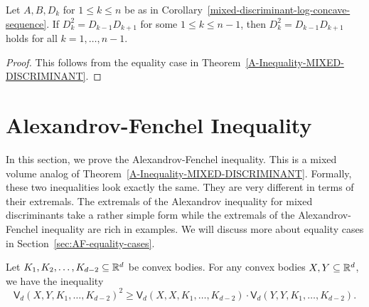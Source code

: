 \documentclass{puthesis-UG}
\begin{document}
\begin{cor} \label{cor-one-implies-all-mixed-discriminants}
	Let $A, B, D_k$ for $1 \leq k \leq n$ be as in Corollary~\ref{mixed-discriminant-log-concave-sequence}. If $D_k^2 = D_{k-1}D_{k+1}$ for some $1 \leq k \leq n-1$, then $D_k^2 = D_{k-1} D_{k+1}$ holds for all $k = 1, \ldots, n-1$. 
\end{cor}

\begin{proof}
	This follows from the equality case in Theorem~\ref{A-Inequality-MIXED-DISCRIMINANT}. 
\end{proof}
\section{Alexandrov-Fenchel Inequality} \label{sec:af-inequality}

In this section, we prove the Alexandrov-Fenchel inequality. This is a mixed volume analog of Theorem~\ref{A-Inequality-MIXED-DISCRIMINANT}. Formally, these two inequalities look exactly the same. They are very different in terms of their extremals. The extremals of the Alexandrov inequality for mixed discriminants take a rather simple form while the extremals of the Alexandrov-Fenchel inequality are rich in examples. We will discuss more about equality cases in Section~\ref{sec:AF-equality-cases}. 

\begin{thm} \label{AF-inequality}
	Let $K_1, K_2, \ldots, K_{d-2} \subseteq \mathbb{R}^d$ be convex bodies. For any convex bodies $X, Y \subseteq \mathbb{R}^d$, we have the inequality
	\[
		\mathsf{V}_d(X, Y, K_1, \ldots, K_{d-2})^2 \geq \mathsf{V}_d(X, X, K_1, \ldots, K_{d-2}) \cdot \mathsf{V}_d(Y, Y, K_1, \ldots, K_{d-2}). 
	\]
\end{thm}
\end{document}
